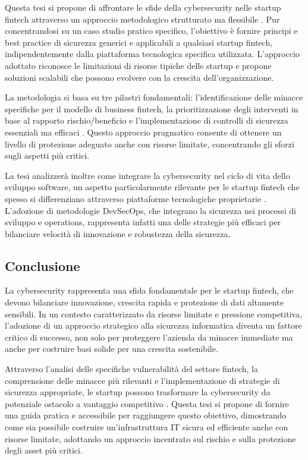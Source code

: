 \documentclass[a4paper,12pt]{report}
\begin{document}
Questa tesi si propone di affrontare le sfide della cybersecurity nelle startup fintech attraverso un approccio metodologico strutturato ma flessibile \cite{fintechChallenges}. Pur concentrandosi su un caso studio pratico specifico, l’obiettivo è fornire principi e best practice di sicurezza generici e applicabili a qualsiasi startup fintech, indipendentemente dalla piattaforma tecnologica specifica utilizzata. L’approccio adottato riconosce le limitazioni di risorse tipiche delle startup e propone soluzioni scalabili che possono evolvere con la crescita dell’organizzazione.

La metodologia si basa su tre pilastri fondamentali: l’identificazione delle minacce specifiche per il modello di business fintech, la prioritizzazione degli interventi in base al rapporto rischio/beneficio e l’implementazione di controlli di sicurezza essenziali ma efficaci \cite{fintechChallenges}. Questo approccio pragmatico consente di ottenere un livello di protezione adeguato anche con risorse limitate, concentrando gli sforzi sugli aspetti più critici.

La tesi analizzerà inoltre come integrare la cybersecurity nel ciclo di vita dello sviluppo software, un aspetto particolarmente rilevante per le startup fintech che spesso si differenziano attraverso piattaforme tecnologiche proprietarie \cite{fintechChallenges}. L’adozione di metodologie DevSecOps, che integrano la sicurezza nei processi di sviluppo e operations, rappresenta infatti una delle strategie più efficaci per bilanciare velocità di innovazione e robustezza della sicurezza.

\subsection*{Conclusione}

La cybersecurity rappresenta una sfida fondamentale per le startup fintech, che devono bilanciare innovazione, crescita rapida e protezione di dati altamente sensibili. In un contesto caratterizzato da risorse limitate e pressione competitiva, l’adozione di un approccio strategico alla sicurezza informatica diventa un fattore critico di successo, non solo per proteggere l’azienda da minacce immediate ma anche per costruire basi solide per una crescita sostenibile.

Attraverso l’analisi delle specifiche vulnerabilità del settore fintech, la comprensione delle minacce più rilevanti e l’implementazione di strategie di sicurezza appropriate, le startup possono trasformare la cybersecurity da potenziale ostacolo a vantaggio competitivo \cite{fintechChallenges,bankingVsFintech}. Questa tesi si propone di fornire una guida pratica e accessibile per raggiungere questo obiettivo, dimostrando come sia possibile costruire un’infrastruttura IT sicura ed efficiente anche con risorse limitate, adottando un approccio incentrato sul rischio e sulla protezione degli asset più critici.
\end{document}
